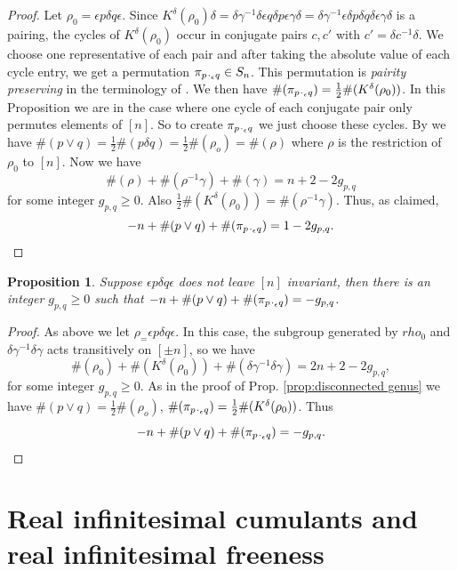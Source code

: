 \documentclass[11pt]{amsart}
\newtheorem{proposition}[theorem]{Proposition}
\theoremstyle{definition}
\numberwithin{theorem}{section}
\newcommand{\peq}{{p \mskip 2mu\cdot_\epsilon q}}
\begin{document}
\begin{proof}
Let $\rho_0 = \epsilon p \delta q \epsilon$. 
Since $K^\delta(\rho_0) \delta = \delta \gamma^{-1} \delta
\epsilon q \delta p \epsilon \gamma \delta = \delta
\gamma^{-1} \epsilon \delta p \delta q \delta \epsilon
\gamma \delta$ is a pairing, the cycles of
$K^\delta(\rho_0)$ occur in conjugate pairs $c, c'$ with $c'
= \delta c^{-1} \delta$. We choose one representative of
each pair and after taking the absolute value of each cycle
entry, we get a permutation $\pi_\peq \in S_n$.  This
permutation is \textit{pairity preserving} in the
terminology of \cite[Lemma 13]{mp}. We then have
$\#(\pi_\peq) = \frac{1}{2} \#(K^\delta(\rho_0))$. In this
Proposition we are in the case where one cycle of each
conjugate pair only permutes elements of $[n]$. So to create
$\pi_\peq$ we just choose these cycles.  By \cite[Lemma
  4]{mp} we have $\#(p \vee q) = \frac{1}{2} \#(p\delta q) =
\frac{1}{2} \#(\rho_o) = \#(\rho)$ where $\rho$ is the
restriction of $\rho_0$ to $[n]$.  Now we have
\[
\#(\rho) + \#(\rho^{-1}\gamma) + \#(\gamma) = n + 2 - 2 g_{p,q}
\]
for some integer $g_{p, q} \geq 0$. Also $ \frac{1}{2} \#(K^\delta(\rho_0)) = \#(\rho^{-1}\gamma)$. Thus, as claimed, 
\[
-n +  \#(p \vee q) + \#(\pi_\peq) = 1 -2 g_{p,q}.
\]
\end{proof}

\begin{proposition}\label{prop:connected genus}
Suppose $\epsilon p \delta q \epsilon$ does not leave $[n]$
invariant, then there is an integer $g_{p,q} \geq 0$ such
that $-n + \#(p \vee q) + \#(\pi_\peq) = - g_{p,q}$.
\end{proposition}

\begin{proof}
As above we let $\rho_= \epsilon p \delta q \epsilon$. In
this case, the subgroup generated by $rho_0$ and $\delta
\gamma^{-1} \delta \gamma$ acts transitively on $[\pm n]$,
so we have
\[
\#(\rho_0) + \#( K^\delta(\rho_0)) + \#(\delta \gamma^{-1} \delta \gamma)
=
2n + 2 - 2 g_{p,q},
\]
for some integer $g_{p, q} \geq 0$. As in the proof of
Prop. \ref{prop:disconnected genus} we have $\#(p \vee q) =
\frac{1}{2} \#(\rho_o)$, $\#(\pi_\peq) = \frac{1}{2}
\#(K^\delta(\rho_0))$. Thus
\[
-n +  \#(p \vee q) + \#(\pi_\peq) = - g_{p,q}.
\]
\end{proof}

\section{Real infinitesimal cumulants and real infinitesimal freeness}
\label{sec:real infinitesimal cumulants and real infinitesimal freeness}
\end{document}
